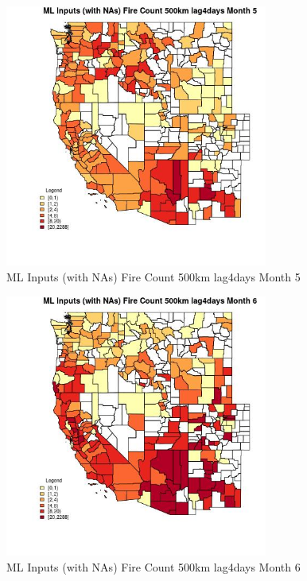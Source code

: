\begin{figure} 
\centering  
\includegraphics[width=0.77\textwidth]{Code_Outputs/Report_ML_input_PM25_Step4_part_e_de_duplicated_aves_compiled_2019-05-20wNAs_CountyFire_Count_500km_lag4daysmedianMonth5.jpg} 
\caption{\label{fig:Report_ML_input_PM25_Step4_part_e_de_duplicated_aves_compiled_2019-05-20wNAsCountyFire_Count_500km_lag4daysmedianMonth5}ML Inputs (with NAs) Fire Count 500km lag4days Month 5} 
\end{figure} 
 

\begin{figure} 
\centering  
\includegraphics[width=0.77\textwidth]{Code_Outputs/Report_ML_input_PM25_Step4_part_e_de_duplicated_aves_compiled_2019-05-20wNAs_CountyFire_Count_500km_lag4daysmedianMonth6.jpg} 
\caption{\label{fig:Report_ML_input_PM25_Step4_part_e_de_duplicated_aves_compiled_2019-05-20wNAsCountyFire_Count_500km_lag4daysmedianMonth6}ML Inputs (with NAs) Fire Count 500km lag4days Month 6} 
\end{figure} 
 

